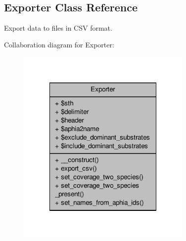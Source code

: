 \hypertarget{classExporter}{\subsection{Exporter Class Reference}
\label{classExporter}
}


Export data to files in C\-S\-V format.  




Collaboration diagram for Exporter\-:\nopagebreak
\begin{figure}[H]
\begin{center}
\leavevmode
\includegraphics[width=240pt]{classExporter__coll__graph}
\end{center}
\end{figure}
